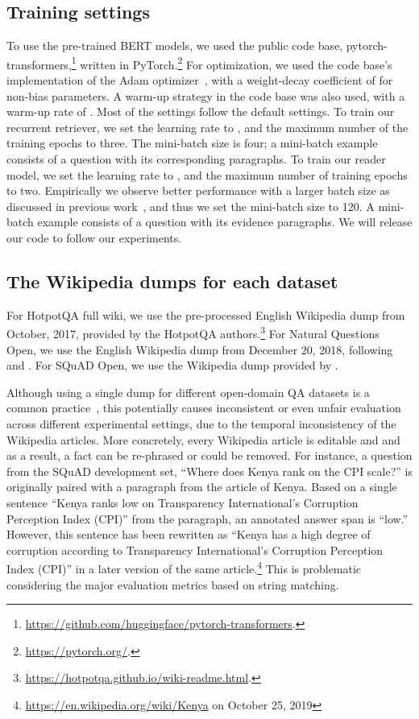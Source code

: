 \documentclass{article} \usepackage{iclr2020_conference,times}
\begin{document}
\subsection{Training settings}
To use the pre-trained BERT models, we used the public code base, pytorch-transformers,\footnote{\url{https://github.com/huggingface/pytorch-transformers}.} written in PyTorch.\footnote{\url{https://pytorch.org/}.}
For optimization, we used the code base's implementation of the Adam optimizer~\citep{adam}, with a weight-decay coefficient of  for non-bias parameters.
A warm-up strategy in the code base was also used, with a warm-up rate of .
Most of the settings follow the default settings.
To train our recurrent retriever, we set the learning rate to , and the maximum number of the training epochs to three.
The mini-batch size is four; a mini-batch example consists of a question with its corresponding paragraphs.
To train our reader model, we set the learning rate to , and the maximum number of training epochs to two.
Empirically we observe better performance with a larger batch size as discussed in previous work~\citep{liu2019roberta,ott-etal-2018-scaling}, and thus we set the mini-batch size to 120.
A mini-batch example consists of a question with its evidence paragraphs.
We will release our code to follow our experiments.

\subsection{The Wikipedia dumps for each dataset}
\label{subsec:appendix_wikipedia_dumps}

For HotpotQA full wiki, we use the pre-processed English Wikipedia dump from October, 2017, provided by the HotpotQA authors.\footnote{\url{https://hotpotqa.github.io/wiki-readme.html}.}
For Natural Questions Open, we use the English Wikipedia dump from December 20, 2018, following \citet{lee-chang-toutanova:2019:ACL2019} and \citet{min2019discrete}.
For SQuAD Open, we use the Wikipedia dump provided by \cite{chen2017reading}.



Although using a single dump for different open-domain QA datasets is a common practice~\citep{chen2017reading,wang2018r,lee2018ranking}, this potentially causes inconsistent or even unfair evaluation across different experimental settings, due to the temporal inconsistency of the Wikipedia articles.
More concretely, every Wikipedia article is editable and and as a result, a fact can be re-phrased or could be removed.
For instance, a question from the SQuAD development set, ``Where does Kenya rank on the CPI scale?'' is originally paired with a paragraph from the article of Kenya.
Based on a single sentence ``Kenya ranks low on Transparency International's Corruption Perception Index (CPI)'' from the paragraph, an annotated answer span is ``low.''
However, this sentence has been rewritten as ``Kenya has a high degree of corruption according to Transparency International's Corruption Perception Index (CPI)'' in a later version of the same article.\footnote{\url{https://en.wikipedia.org/wiki/Kenya} on October 25, 2019}
This is problematic considering the major evaluation metrics based on string matching.
\end{document}
